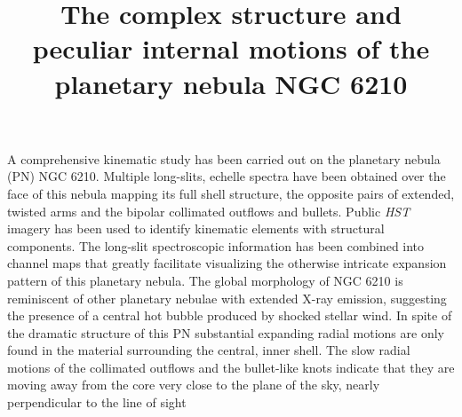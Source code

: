 \documentclass{aa}
\begin{document}
 

\title{The complex structure and peculiar internal motions of the planetary nebula NGC 6210}


\abstract
{A comprehensive kinematic study has been carried out on the planetary nebula (PN) NGC 6210. Multiple long-slits, echelle spectra have been obtained over the face of this nebula mapping its full shell structure, the opposite pairs of extended, twisted arms and the bipolar collimated outflows and bullets. Public {\it HST} imagery has been used to identify kinematic elements with structural components. The long-slit spectroscopic information has been combined into channel maps that greatly facilitate visualizing the otherwise intricate expansion pattern of this  planetary nebula. The global morphology of NGC 6210 is  reminiscent of other planetary nebulae with extended X-ray emission, suggesting the presence of a central hot bubble produced by shocked stellar wind. In spite of the dramatic structure of this PN substantial expanding radial motions are only found in the material surrounding the central, inner shell. The slow radial motions of the collimated outflows and the bullet-like knots indicate that they are  moving away from the core very close to the plane of the sky, nearly perpendicular to the line of sight}


\maketitle
\end{document}
